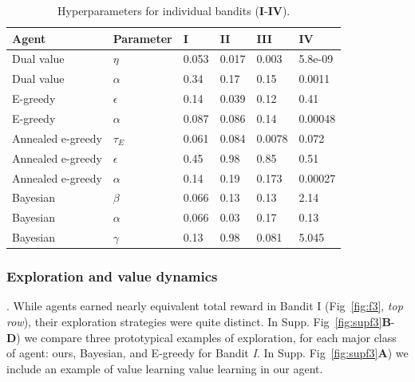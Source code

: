 \begin{table}[]
\caption{Hyperparameters for individual bandits (\textbf{I}-\textbf{IV}).}
\label{tab:hp}
\begin{tabular}{|l|l|l|l|l|l|}
\hline
\textbf{Agent} & \textbf{Parameter} & \textbf{I} & \textbf{II} & \textbf{III} & \textbf{IV} \\ \hline
Dual value & $\eta$ & 0.053 & 0.017 & 0.003 & 5.8e-09 \\ \hline
Dual value & $\alpha$ & 0.34 & 0.17 & 0.15 & 0.0011 \\ \hline
E-greedy & $\epsilon$ & 0.14 & 0.039 & 0.12 & 0.41 \\ \hline
E-greedy & $\alpha$ & 0.087 & 0.086 & 0.14 & 0.00048 \\ \hline
Annealed e-greedy & $\tau_E$ & 0.061 & 0.084 & 0.0078 & 0.072 \\ \hline
Annealed e-greedy & $\epsilon$ & 0.45 & 0.98 & 0.85 & 0.51 \\ \hline
Annealed e-greedy & $\alpha$ & 0.14 & 0.19 & 0.173 & 0.00027 \\ \hline
Bayesian & $\beta$ & 0.066 & 0.13 & 0.13 & 2.14 \\ \hline
Bayesian & $\alpha$ & 0.066 & 0.03 & 0.17 & 0.13 \\ \hline
Bayesian & $\gamma$ & 0.13 & 0.98 & 0.081 & 5.045 \\ \hline
\end{tabular}
\end{table}

\subsubsection*{Exploration and value dynamics}. 
While agents earned nearly equivalent total reward in Bandit I (Fig~\ref{fig:f3}, \textit{top row}), their exploration strategies were quite distinct. In Supp. Fig~\ref{fig:supf3}\textbf{B}-\textbf{D}) we compare three prototypical examples of exploration, for each major class of agent: ours, Bayesian, and E-greedy for Bandit \textit{I}. In Supp. Fig~\ref{fig:supf3}\textbf{A}) we include an example of value learning value learning in our agent.

